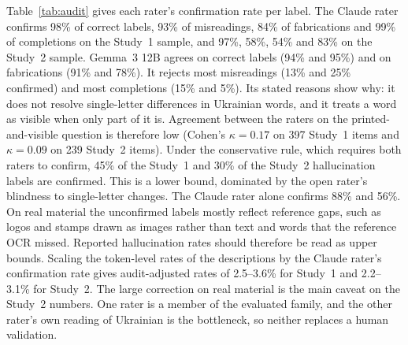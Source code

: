 \documentclass[pdflatex,sn-mathphys-num]{sn-jnl}%
\theoremstyle{thmstyleone}%
\theoremstyle{thmstyletwo}%
\theoremstyle{thmstylethree}%
\newcommand{\RealAdjRange}{2.2--3.1}
\newcommand{\RealAudComplCl}{83}
\newcommand{\RealAudComplGm}{5}
\newcommand{\RealAudCorrCl}{97}
\newcommand{\RealAudCorrGm}{95}
\newcommand{\RealAudFabCl}{54}
\newcommand{\RealAudFabGm}{78}
\newcommand{\RealAudHall}{30}
\newcommand{\RealAudHallCl}{56}
\newcommand{\RealAudKappa}{0.09}
\newcommand{\RealAudMisCl}{58}
\newcommand{\RealAudMisGm}{25}
\newcommand{\RealAudNBoth}{239}
\newcommand{\SynAdjRange}{2.5--3.6}
\newcommand{\SynAudComplCl}{99}
\newcommand{\SynAudComplGm}{15}
\newcommand{\SynAudCorrCl}{98}
\newcommand{\SynAudCorrGm}{94}
\newcommand{\SynAudFabCl}{84}
\newcommand{\SynAudFabGm}{91}
\newcommand{\SynAudHall}{45}
\newcommand{\SynAudHallCl}{88}
\newcommand{\SynAudKappa}{0.17}
\newcommand{\SynAudMisCl}{93}
\newcommand{\SynAudMisGm}{13}
\newcommand{\SynAudNBoth}{397}
\begin{document}
Table~\ref{tab:audit} gives each rater's confirmation rate per label. The Claude rater confirms \SynAudCorrCl\% of correct labels, \SynAudMisCl\% of misreadings, \SynAudFabCl\% of fabrications and \SynAudComplCl\% of completions on the Study~1 sample, and \RealAudCorrCl\%, \RealAudMisCl\%, \RealAudFabCl\% and \RealAudComplCl\% on the Study~2 sample. Gemma~3 12B agrees on correct labels (\SynAudCorrGm\% and \RealAudCorrGm\%) and on fabrications (\SynAudFabGm\% and \RealAudFabGm\%). It rejects most misreadings (\SynAudMisGm\% and \RealAudMisGm\% confirmed) and most completions (\SynAudComplGm\% and \RealAudComplGm\%). Its stated reasons show why: it does not resolve single-letter differences in Ukrainian words, and it treats a word as visible when only part of it is. Agreement between the raters on the printed-and-visible question is therefore low (Cohen's $\kappa=\SynAudKappa$ on \SynAudNBoth{} Study~1 items and $\kappa=\RealAudKappa$ on \RealAudNBoth{} Study~2 items). Under the conservative rule, which requires both raters to confirm, \SynAudHall\% of the Study~1 and \RealAudHall\% of the Study~2 hallucination labels are confirmed. This is a lower bound, dominated by the open rater's blindness to single-letter changes. The Claude rater alone confirms \SynAudHallCl\% and \RealAudHallCl\%. On real material the unconfirmed labels mostly reflect reference gaps, such as logos and stamps drawn as images rather than text and words that the reference OCR missed. Reported hallucination rates should therefore be read as upper bounds. Scaling the token-level rates of the descriptions by the Claude rater's confirmation rate gives audit-adjusted rates of \SynAdjRange\% for Study~1 and \RealAdjRange\% for Study~2. The large correction on real material is the main caveat on the Study~2 numbers. One rater is a member of the evaluated family, and the other rater's own reading of Ukrainian is the bottleneck, so neither replaces a human validation.
\end{document}

